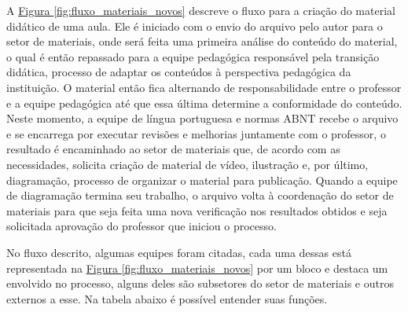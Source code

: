 A \hyperref[fig:fluxo_materiais_novos]{Figura \ref{fig:fluxo_materiais_novos}} descreve o fluxo para a criação do material didático de uma aula. Ele é iniciado com o envio do arquivo pelo autor para o setor de materiais, onde será feita uma primeira análise do conteúdo do material, o qual é então repassado para a equipe pedagógica responsável pela transição didática, processo de adaptar os conteúdos à perspectiva pedagógica da instituição. O material então fica alternando de responsabilidade entre o professor e a equipe pedagógica até que essa última determine a conformidade do conteúdo. Neste momento, a equipe de língua portuguesa e normas ABNT recebe o arquivo e se encarrega por executar revisões e melhorias juntamente com o professor, o resultado é encaminhado ao setor de materiais que, de acordo com as necessidades, solicita criação de material de vídeo, ilustração e, por último, diagramação, processo de organizar o material para publicação. Quando a equipe de diagramação termina seu trabalho, o arquivo volta à coordenação do setor de materiais para que seja feita uma nova verificação nos resultados obtidos e seja solicitada aprovação do professor que iniciou o processo.

No fluxo descrito, algumas equipes foram citadas, cada uma dessas está representada na \hyperref[fig:fluxo_materiais_novos]{Figura \ref{fig:fluxo_materiais_novos}} por um bloco e destaca um envolvido no processo, alguns deles são subsetores do setor de materiais e outros externos a esse. Na tabela abaixo é possível entender suas funções.

